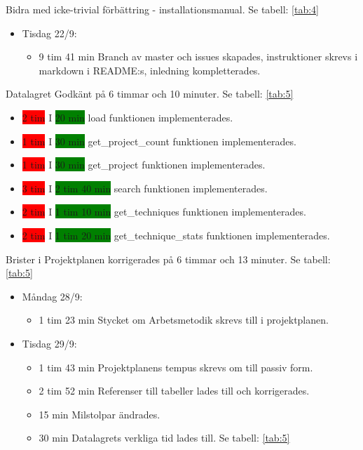 \documentclass{TDP003mall}
\begin{document}
Bidra med icke-trivial förbättring - installationsmanual. Se tabell: \ref{tab:4}
\begin{itemize}
\item Tisdag 22/9:
  \begin{itemize}
  \item 9 tim 41 min Branch av master och issues skapades, instruktioner skrevs i markdown i README:s, inledning kompletterades.
  \end{itemize}
  \end{itemize}

Datalagret Godkänt på 6 timmar och 10 minuter. Se tabell: \ref{tab:5}
\begin{itemize}
\item \colorbox{red}{2 tim} I \colorbox{green}{20 min} load funktionen implementerades.
\item \colorbox{red}{1 tim} I \colorbox{green}{30 min} get\_project\_count funktionen implementerades.
\item \colorbox{red}{1 tim} I \colorbox{green}{30 min} get\_project funktionen implementerades.
\item \colorbox{red}{3 tim} I \colorbox{green}{2 tim 40 min} search funktionen implementerades.
\item \colorbox{red}{2 tim} I \colorbox{green}{1 tim 10 min} get\_techniques funktionen implementerades.
\item \colorbox{red}{2 tim} I \colorbox{green}{1 tim 20 min} get\_technique\_stats funktionen implementerades.
\end{itemize}

Brister i Projektplanen korrigerades på 6 timmar och 13 minuter. Se tabell: \ref{tab:5}
\begin{itemize}
  \item Måndag 28/9:
  \begin{itemize}
  \item 1 tim 23 min Stycket om Arbetsmetodik skrevs till i projektplanen.
  \end{itemize}
  \item Tisdag 29/9:
  \begin{itemize}
\item 1 tim 43 min Projektplanens tempus skrevs om till passiv form.
\item 2 tim 52 min Referenser till tabeller lades till och korrigerades.
\item 15 min Milstolpar ändrades.
  \item 30 min Datalagrets verkliga tid lades till. Se tabell: \ref{tab:5}
  \end{itemize}
  \end{itemize}
\end{document}
